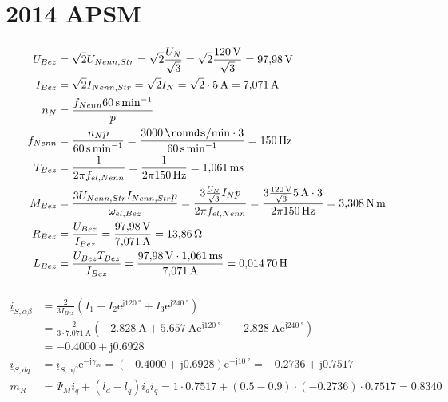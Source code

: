 \documentclass[11pt,a4paper]{scrartcl}
\newcommand{\mybr}[1]{\left(#1\right)}
\renewcommand{\j}{\mathrm{j}}
\renewcommand{\i}{\underline{i}}
\newcommand{\0}{_{\mybr{0}}}
\newcommand{\1}{_{\mybr{1}}}
\newcommand{\2}{_{\mybr{2}}}
\renewcommand{\e}{\mathrm{e}}
\newcommand{\isab}{\i_{S,\alpha\beta}}
\newcommand{\isdq}{\i_{S,dq}}
\begin{document}
\clearpage
\part{2014 APSM}
\section{}
\begin{align}
U_{Bez}&=\sqrt{2}U_{Nenn,Str}=\sqrt{2}\frac{U_N}{\sqrt{3}}=\sqrt{2}\frac{\SI{120}{\volt}}{\sqrt{3}}=\SI{97.98}{\volt}\\
I_{Bez}&=\sqrt{2}I_{Nenn,Str}=\sqrt{2}I_N=\sqrt{2}\cdot\SI{5}{\ampere}=\SI{7.071}{\ampere}\\
n_N&=\frac{f_{Nenn}\SI{60}{\second\per\minute}}{p}\\
f_{Nenn}&=\frac{n_N p}{\SI{60}{\second\per\minute}}=\frac{\SI{3000}{\rounds\per\minute}\cdot 3}{\SI{60}{\second\per\minute}}=\SI{150}{\hertz}\\
T_{Bez}&=\frac{1}{2\pi f_{el,Nenn}}=\frac{1}{2\pi\SI{150}{\hertz}}=\SI{1.061}{\milli\second}\\
M_{Bez}&=\frac{3 U_{Nenn,Str}I_{Nenn,Str}p}{\omega_{el,Bez}}=\frac{3 \frac{U_N}{\sqrt{3}}I_{N}p}{2\pi f_{el,Nenn}}=\frac{3\frac{\SI{120}{\volt}}{\sqrt{3}}\SI{5}{\ampere}\cdot 3}{2\pi\SI{150}{\hertz}}=\SI{3.308}{\newton\metre}\\
R_{Bez}&=\frac{U_{Bez}}{I_{Bez}}=\frac{\SI{97.98}{\volt}}{\SI{7.071}{\ampere}}=\SI{13.86}{\ohm}\\
L_{Bez}&=\frac{U_{Bez}T_{Bez}}{I_{Bez}}=\frac{\SI{97.98}{\volt}\cdot\SI{1.061}{\milli\second}}{\SI{7.071}{\ampere}}=\SI{0.01470}{\henry}
\end{align}

\section{}
\begin{align}
\isab&=\frac{2}{3I_{Bez}}\mybr{I_1+I_2 \e^{\j\SI{120}{\degree}}+I_3\e^{\j\SI{240}{\degree}}}\\
	&=\frac{2}{3\cdot\SI{7.071}{\ampere}}\mybr{\SI{-2.828}{\ampere}+\SI{5.657}{\ampere} \e^{\j\SI{120}{\degree}}+\SI{-2.828}{\ampere}\e^{\j\SI{240}{\degree}}}\\
			&=\num{-0.4000}+\j\num{0.6928}\\
\isdq&=\isab\e^{-\j\gamma_m}=\mybr{\num{-0.4000}+\j\num{0.6928}}\e^{-\j\SI{10}{\degree}}=\num{-0.2736}+\j\num{0.7517}\\
m_R&=\Psi_M i_q +\mybr{l_d-l_q}i_d i_q = \num{1}\cdot\num{0.7517}+\mybr{\num{0.5}-\num{0.9}}\cdot\mybr{\num{-0.2736}}\cdot\num{0.7517}=\num{0.8340}
\end{align}
\end{document}
